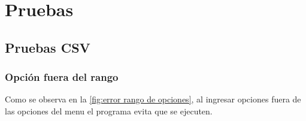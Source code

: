 \documentclass[12pt]{article}
\begin{document}
\section{Pruebas}

\subsection{Pruebas CSV}
\subsubsection{Opción fuera del rango}

Como se observa en la \autoref{fig:error rango de opciones}, al ingresar opciones fuera de las opciones del menu 
el programa evita que se ejecuten.
\end{document}
